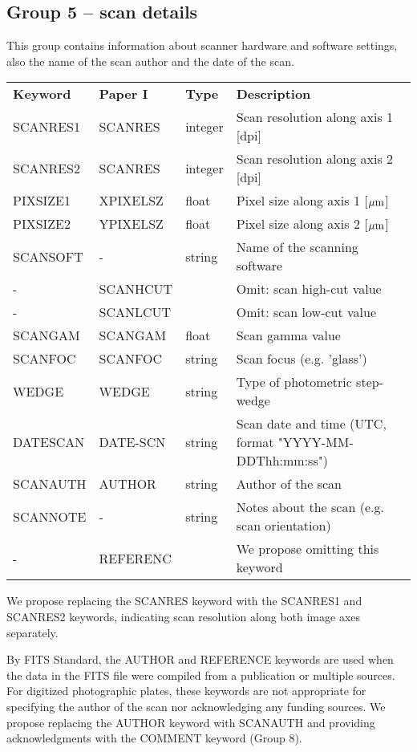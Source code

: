 \documentclass[11pt]{ivoa}
\begin{document}
\subsection{Group 5 – scan details}

This group contains information about scanner hardware and software
settings, also the name of the scan author and the date of the scan.

\begin{inlinetable}
\footnotesize
\begin{tabular}{lllp{}}
\sptablerule
\textbf{Keyword}&\textbf{Paper I}&\textbf{Type}&\textbf{Description}\\
\sptablerule
SCANRES1 &SCANRES    &integer &Scan resolution along axis 1 [dpi]\\
SCANRES2 &SCANRES    &integer &Scan resolution along axis 2 [dpi]\\
PIXSIZE1 &XPIXELSZ   &float   &Pixel size along axis 1 [$\mu\rm m$]\\
PIXSIZE2 &YPIXELSZ   &float   &Pixel size along axis 2 [$\mu\rm m$]\\
SCANSOFT &-          &string  &Name of the scanning software\\
-        &SCANHCUT   &        &Omit: scan high-cut value\\
-        &SCANLCUT   &        &Omit: scan low-cut value\\
SCANGAM  &SCANGAM    &float   &Scan gamma value\\
SCANFOC  &SCANFOC    &string  &Scan focus (e.g. 'glass')\\
WEDGE    &WEDGE      &string  &Type of photometric step-wedge\\
DATESCAN &DATE-SCN   &string  &
  Scan date and time (UTC, format "YYYY-MM-DDThh:mm:ss")\\
SCANAUTH &AUTHOR     &string  &Author of the scan\\
SCANNOTE &-          &string  &
  Notes about the scan (e.g. scan orientation)\\
-        &REFERENC   &        &We propose omitting this keyword \
\end{tabular}
\end{inlinetable}


We propose replacing the SCANRES keyword with the SCANRES1 and SCANRES2
keywords, indicating scan resolution along both image axes separately.

By FITS Standard, the AUTHOR and REFERENCE keywords are used when the
data in the FITS file were compiled from a publication or multiple
sources. For digitized photographic plates, these keywords are not
appropriate for specifying the author of the scan nor acknowledging any
funding sources. We propose replacing the AUTHOR keyword with SCANAUTH
and providing acknowledgments with the COMMENT keyword (Group 8).
\end{document}
